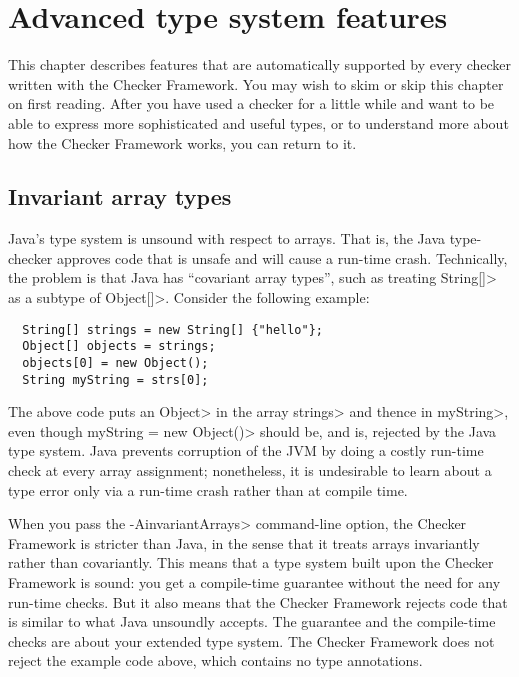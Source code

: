 \htmlhr
\chapter{Advanced type system features\label{advanced-type-system-features}}

This chapter describes features that are automatically supported by every
checker written with the Checker Framework.
You may wish to skim or skip this chapter on first reading.  After you have
used a checker for a little while and want to be able to express more
sophisticated and useful types, or to understand more about how the Checker
Framework works, you can return to it.


\section{Invariant array types\label{invariant-arrays}}

Java's type system is unsound with respect to arrays.  That is, the Java
type-checker approves code that is unsafe and will cause a run-time crash.
Technically, the problem is that Java has ``covariant array types'', such
as treating \<String[]> as a subtype of \<Object[]>.  Consider the
following example:

\begin{Verbatim}
  String[] strings = new String[] {"hello"};
  Object[] objects = strings;
  objects[0] = new Object();
  String myString = strs[0];
\end{Verbatim}

\noindent
The above code puts an \<Object> in the array \<strings> and thence in
\<myString>, even though \<myString = new Object()> should be, and is,
rejected by the Java type system.  Java prevents corruption of the JVM by
doing a costly run-time check at every array assignment; nonetheless, it is
undesirable to learn about a type error only via a run-time crash rather
than at compile time.

When you pass the \<-AinvariantArrays> command-line option,
the Checker Framework is stricter than Java, in the sense that it treats
arrays invariantly rather than covariantly.  This means that a type system
built upon the Checker Framework is sound:  you get a compile-time
guarantee without the need for any run-time checks.  But it also means that
the Checker Framework rejects code that is similar to what Java unsoundly
accepts.  The guarantee and the compile-time checks are about your
extended type system.  The Checker Framework does not reject the example
code above, which contains no type annotations.

